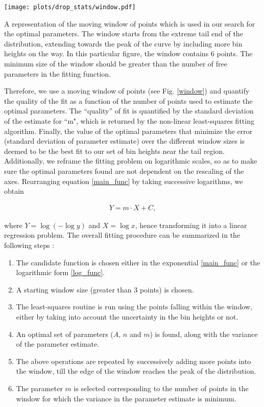\begin{marginfigure}[-1cm]
\centering
\texttt{[image: plots/drop\_stats/window.pdf]}
\caption{A representation of the moving window of points which
	is used in our search for the optimal parameters.
	The window starts from the extreme tail end of the 
	distribution, extending towards the peak of the curve
	by including more bin heights on the way. In this 
	particular figure, the window contains $6$ points.
	The minimum size of the window should be greater than
	the number of free parameters in the fitting function.}
\label{window}
\end{marginfigure}


Therefore, we use a moving window of points (see Fig. \ref{window}) and quantify 
the quality of the fit as a function of the number of points used to estimate the optimal parameters.
The ``quality'' of fit is quantified by the standard deviation of the
estimate for ``m", which is returned by the non-linear least-squares fitting algorithm.  
Finally, the value of the optimal parameters that minimize the error 
(standard deviation of parameter estimate) over the different window sizes 
is deemed to be the best fit to our set of bin heights near the tail region.
Additionally, we reframe the fitting problem on logarithmic scales, so 
as to make sure the optimal parameters found are not dependent on the rescaling of the axes. 
Rearranging equation \eqref{main_func} by taking successive logarithms, we obtain 

\begin{align}
Y = m \cdot X + C ,
\label{log_func}
\end{align}

where $Y = \log(-\log y)$ and $X = \log x$, hence transforming it into a linear regression problem.
The overall fitting procedure can be summarized in the following steps : 

\begin{enumerate}
	\item The candidate function is chosen either in the exponential \eqref{main_func}
		or the logarithmic form \eqref{log_func}.
	\item A starting window size (greater than 3 points) is chosen.
	\item The least-squares routine is run using the points falling within the window,
		either by taking into account the uncertainty in the bin heights or not.
	\item An optimal set of parameters ($A$, $n$ and $m$) is found, along with the variance
		of the parameter estimate. 
	\item The above operations are repeated by successively adding more points into the window,
		till the edge of the window reaches the peak of the distribution. 
	\item The parameter $m$ is selected corresponding to the number of points in the window 
		for which the variance in the parameter estimate is minimum. 
\end{enumerate}


